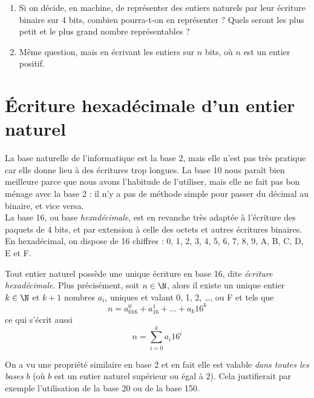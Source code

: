 \documentclass[a4paper,12pt,french]{book}
\begin{document}
\begin{exercice}[]
	\begin{enumerate}[\bfseries 1.]
		\item 		Si on décide, en machine, de représenter des entiers naturels par leur écriture binaire sur 4 bits, combien pourra-t-on en représenter ? Quels seront les plus petit et le plus grand nombre représentables ?
		\item 	Même question, mais en écrivant les entiers sur $n$ bits, où $n$ est un entier positif.
	\end{enumerate}
\end{exercice}
\section{\'Ecriture hexadécimale d'un entier naturel}

La base \og naturelle \fg{} de l'informatique est la base 2, mais elle n'est pas très pratique car elle donne lieu à 
des écritures trop longues.
La base 10 nous paraît bien meilleure parce que nous avons l'habitude de l'utiliser, mais elle ne fait pas bon ménage 
avec la base 2 : il n'y a pas de méthode simple pour passer du décimal au binaire, et vice versa.\\
La base 16, ou base \textit{hexadécimale}, est en revanche très adaptée à l'écriture des paquets de 4 bits, et par 
extension à celle des octets et autres écritures binaires.\\

En hexadécimal, on dispose de 16 chiffres : 0, 1, 2, 3, 4, 5, 6, 7, 8, 9, A, B, C, D, E et F.

\begin{propriete}
Tout entier naturel possède une unique écriture en base 16, dite \textit{écriture hexadécimale}.
Plus précisément, soit $n\in\N$, alors il existe un unique entier $k\in\N$ et $k+1$ nombres $a_i$, uniques et valant 0, 1, 2, \ldots, ou F et tels 
que $$n=a_016^0+a_16^1+\ldots+a_k16^k$$
ce qui s'écrit aussi
 $$n=\sum_{i=0}^ka_i16^i$$
\end{propriete}

\begin{remarque}
On a vu une propriété similaire en base 2 et en fait elle est valable \textit{dans toutes les bases}  $b$ (où $b$ est un entier naturel supérieur ou 
égal à 2). Cela justifierait par exemple l'utilisation de la base 20 ou de la base 150.
\end{remarque}
\end{document}
